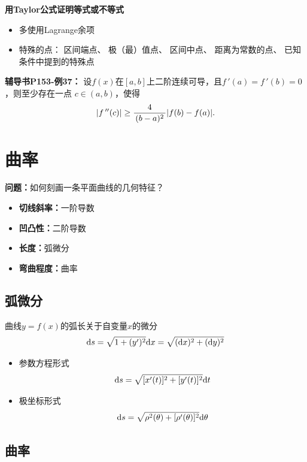{\bf 用Taylor公式证明等式或不等式} 
\begin{itemize}
  \item 多使用Lagrange余项
  \item 特殊的点： 区间端点、 极（最）值点、
  区间中点、 距离为常数的点、 已知条件中提到的特殊点
\end{itemize}

{\bf 辅导书P153-例37：}
设$f(x)$在$[a,b]$上二阶连续可导，且$f\,'(a)=f\,'(b)=0$，则至少存在一点
$c\in(a,b)$，使得
$$|f\,''(c)|\geq \displaystyle\frac{\,{4}\,}{\,{(b-a)^2}\,}|f(b)-f(a)|.$$

\section{曲率}

{\bf 问题：}如何刻画一条平面曲线的几何特征？

\begin{itemize}
  \setlength{\itemindent}{1cm}
  \item {\bf 切线斜率：}一阶导数
  \item {\bf 凹凸性：}二阶导数
  \item {\bf 长度：}弧微分
  \item {\bf 弯曲程度：}曲率
\end{itemize}

\subsection{弧微分}

曲线$y=f(x)$的弧长关于自变量$x$的微分 
$$\mathrm{d} s=\sqrt{1+(y')^2}\mathrm{d} x =\sqrt{(\mathrm{d} x)^2+(\mathrm{d} y)^2}$$ 
\begin{itemize}
  \setlength{\itemindent}{1cm}
  \item 参数方程形式 
  $$\mathrm{d} s=\sqrt{[x'(t)]^2+[y'(t)]^2}\mathrm{d} t$$ 
  \vspace{-3ex}
  \item 极坐标形式 
  $$\mathrm{d} s=\sqrt{\rho^2(\theta)+[\rho'(\theta)]^2}\mathrm{d}\theta$$
\end{itemize}

\subsection{曲率}

